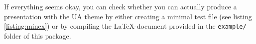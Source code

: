 If everything seems okay, you can check whether you can actually produce a presentation with the UA theme by either creating a minimal test file (see listing \ref{listing:minex}) or by compiling the \LaTeX-document provided in the \lstinline!example/! folder of this package. 


\begin{figure}
\centering
\setlength{\figurewidth}{6cm}


\end{figure}
